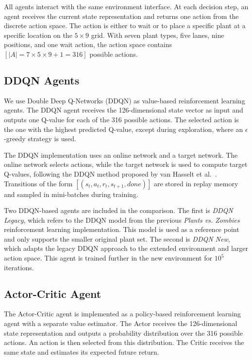 \documentclass[conference,onecolumn]{IEEEtran}
\begin{document}
All agents interact with the same environment interface. At each decision step, an agent receives the current state representation and returns one action from the discrete action space. The action is either to wait or to place a specific plant at a specific location on the $5 \times 9$ grid. With seven plant types, five lanes, nine positions, and one wait action, the action space contains
$[
|A| = 7 \times 5 \times 9 + 1 = 316
]$
possible actions.

\subsection{DDQN Agents}

We use Double Deep Q-Networks (DDQN) as value-based reinforcement learning agents. The DDQN agent receives the 126-dimensional state vector as input and outputs one Q-value for each of the 316 possible actions. The selected action is the one with the highest predicted Q-value, except during exploration, where an $\epsilon$-greedy strategy is used.

The DDQN implementation uses an online network and a target network. The online network selects actions, while the target network is used to compute target Q-values, following the DDQN method proposed by van Hasselt et al.~\cite{van2016deep}. Transitions of the form
$[
(s_t, a_t, r_t, s_{t+1}, done)
]$
are stored in replay memory and sampled in mini-batches during training.

Two DDQN-based agents are included in the comparison. The first is \textit{DDQN Legacy}, which refers to the DDQN model from the previous \textit{Plants vs. Zombies} reinforcement learning implementation. This model is used as a reference point and only supports the smaller original plant set. The second is \textit{DDQN New}, which adapts the legacy DDQN approach to the extended environment and larger action space. This agent is trained further in the new environment for $10^5$ iterations.

\subsection{Actor-Critic Agent}

The Actor-Critic agent is implemented as a policy-based reinforcement learning agent with a separate value estimator. The Actor receives the 126-dimensional state representation and outputs a probability distribution over the 316 possible actions. An action is then selected from this distribution. The Critic receives the same state and estimates its expected future return.
\end{document}
